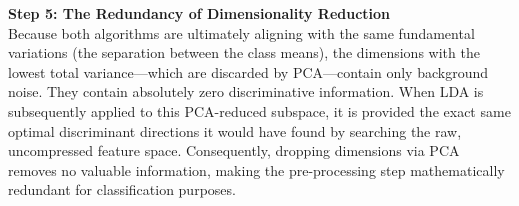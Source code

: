 \vspace{0.3cm}
\noindent\textbf{Step 5: The Redundancy of Dimensionality Reduction}\\
Because both algorithms are ultimately aligning with the same fundamental variations (the separation between the class means), the dimensions with the lowest total variance---which are discarded by PCA---contain only background noise. They contain absolutely zero discriminative information. When LDA is subsequently applied to this PCA-reduced subspace, it is provided the exact same optimal discriminant directions it would have found by searching the raw, uncompressed feature space. Consequently, dropping dimensions via PCA removes no valuable information, making the pre-processing step mathematically redundant for classification purposes.